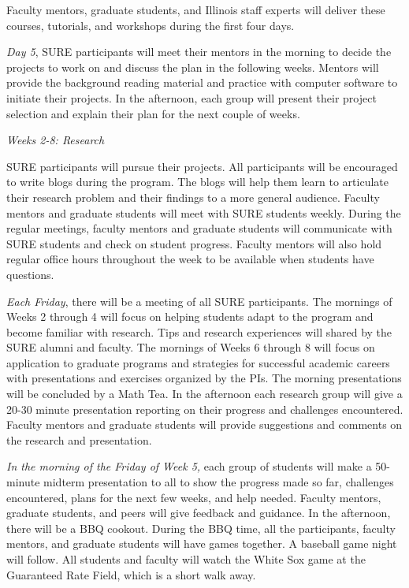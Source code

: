 \documentclass[11pt]{NSFamsart}
\begin{document}
 
Faculty mentors, graduate students, and Illinois staff experts will deliver these courses, tutorials, and workshops during the first four days.

\emph{Day 5}, SURE participants will meet their mentors in the morning to decide the projects to work on and discuss the plan in the following weeks. Mentors will provide the background
reading material and practice with computer software to initiate their projects. In the afternoon, each group will present their project selection and explain their plan for the next couple of weeks.


\centerline{\emph{Weeks 2-8: Research}}

SURE participants will pursue their projects. All participants will be encouraged to write blogs \cite{Hig21a} during the program. The blogs will help them learn to articulate their research problem and their findings to a more general audience. Faculty mentors and graduate
students will meet with SURE students weekly. During the regular meetings, faculty mentors and graduate students will communicate with SURE students and check on student progress. Faculty mentors will also hold regular office hours throughout the week to be available when students have questions.

\emph{Each Friday}, there will be a meeting of all SURE participants. The mornings of Weeks 2 through 4 will focus on helping students adapt to the program and become familiar with research. Tips and research experiences will shared by the SURE alumni and faculty. The mornings of Weeks 6 through 8 will focus on application to graduate programs and strategies for successful academic careers with presentations and exercises organized by the PIs. The morning presentations will  be concluded by a Math Tea.  In the afternoon each research group will give a 20-30 minute presentation reporting on their progress and challenges encountered. Faculty mentors and graduate students will provide suggestions and comments on the research and presentation.

\emph{In the morning of the Friday of Week 5,}
each group of students will make a 50-minute midterm presentation to all to show the progress made so far, challenges encountered, plans for the next few weeks, and help needed. Faculty mentors,
graduate students, and peers will give feedback and guidance. In the afternoon, there will be a BBQ cookout. During the BBQ time, all the participants, faculty mentors, and graduate students will have games together. A baseball game night  
will follow. All students and faculty will watch the White Sox game at the Guaranteed Rate Field, which is a short walk away.
\end{document}
